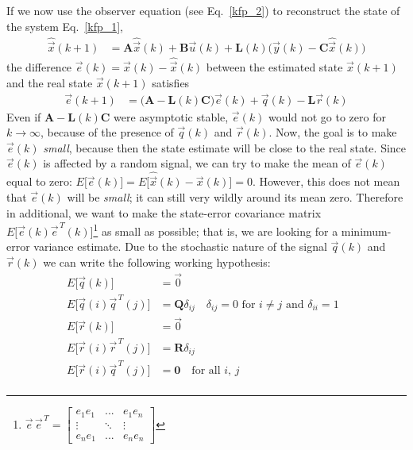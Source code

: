 \documentclass[12pt,a4paper,oneside]{book}
\begin{document}
\begin{onehalfspace}
If we now use the observer equation (see Eq.~\eqref{kfp_2}) to reconstruct the 
state of the system Eq.~\eqref{kfp_1}, 
\begin{equation}\label{kfp_2}
	\begin{aligned}
		\hat{\vec{x}}(k+1) &= \mathbf{A}\hat{\vec{x}}(k)+\mathbf{B}\vec{u}(k) + 
		\mathbf{L}(k)\Big(\vec{y}(k)-\mathbf{C}\hat{\vec{x}}(k)\Big)
	\end{aligned}
\end{equation}
the difference $\vec{e}(k)=\vec{x}(k)-\hat{\vec{x}}(k)$ between the estimated 
state $\hat{\vec{x}}(k+1)$ and the real state ${\vec{x}}(k+1)$ satisfies
\begin{equation}\label{kfp_3}
	\begin{aligned}
		{\vec{e}}(k+1) &= 
		\Big(\mathbf{A}-\mathbf{L}(k)\mathbf{C}\Big){\vec{e}}(k)+\vec{q}(k) - 
		\mathbf{L}\vec{r}(k)
	\end{aligned}
\end{equation}
Even if $\mathbf{A}-\mathbf{L}(k)\mathbf{C}$ were asymptotic stable, 
$\vec{e}(k)$ would not go to zero for $k\rightarrow\infty$, because of the 
presence of $\vec{q}(k)$ and $\vec{r}(k)$. Now, the goal is to make 
$\vec{e}(k)$ \textit{small}, because then the state estimate will be close to 
the real state. Since $\vec{e}(k)$ is affected by a random signal, we can try 
to make the mean of $\vec{e}(k)$ equal to zero: $E\Big[\vec{e}(k)\Big] = 
E\Big[\hat{\vec{x}}(k)-\vec{x}(k)\Big]=0$. However, this does not mean that 
$\vec{e}(k)$ will be \textit{small}; it can still very wildly around its mean 
zero. Therefore in additional, we want to make the state-error covariance 
matrix $E\Big[\vec{e}(k)\vec{e}^{\,T}(k)\Big]$\footnote{$\vec{e}\,\vec{e}^{\,T} 
= \begin{bmatrix}
		e_1e_1& ... & e_1e_n \\ \vdots&\ddots&\vdots \\ e_ne_1&...&e_ne_n
	\end{bmatrix}$} as small as possible; that is, we are looking for a 
	minimum-error variance estimate. 
Due to the stochastic nature of the signal $\vec{q}(k)$ and $\vec{r}(k)$ we can 
write the following working hypothesis:
\begin{equation}\label{kfp_4}
	\begin{aligned}
		E\Big[\vec{q}(k)\Big] &= \vec{0} \\[6pt]
		E\Big[\vec{q}(i)\vec{q}^{\,T}(j)\Big] &= \mathbf{Q}\delta_{ij} 
		\quad\text{$\delta_{ij} =0$ for $i\ne j$ and $\delta_{ii}=1$ }\\[6pt]
		E\Big[\vec{r}(k)\Big] &= \vec{0} \\[6pt]
		E\Big[\vec{r}(i)\vec{r}^{\,T}(j)\Big] &= \mathbf{R}\delta_{ij} \\[6pt]
		E\Big[\vec{r}(i)\vec{q}^{\,T}(j)\Big] &= \mathbf{0} \quad\text{for all 
		}i,\,j \\[6pt]
	\end{aligned}
\end{equation}



\end{onehalfspace}
\end{document}
